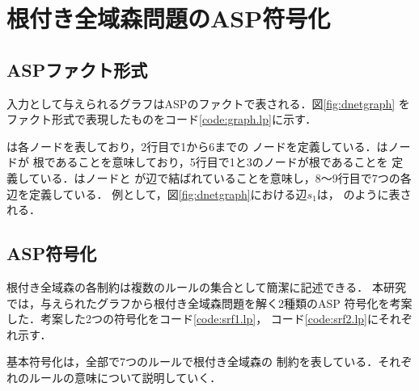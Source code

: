 \section{根付き全域森問題のASP符号化}

\subsection{ASPファクト形式}
入力として与えられるグラフはASPのファクトで表される．図\ref{fig:dnetgraph}
をファクト形式で表現したものをコード\ref{code:graph.lp}に示す．



は各ノードを表しており，2行目で1から6までの
ノードを定義している．はノードが
根であることを意味しており，5行目で1と3のノードが根であることを
定義している．はノードと
が辺で結ばれていることを意味し，8～9行目で7つの各辺を定義している．
例として，図\ref{fig:dnetgraph}における辺$s_{1}$は，
のように表される．

\subsection{ASP符号化}
根付き全域森の各制約は複数のルールの集合として簡潔に記述できる．
本研究では，与えられたグラフから根付き全域森問題を解く2種類のASP
符号化を考案した．考案した2つの符号化をコード\ref{code:srf1.lp}，
コード\ref{code:srf2.lp}にそれぞれ示す．





基本符号化は，全部で7つのルールで根付き全域森の
制約を表している．それぞれのルールの意味について説明していく．

